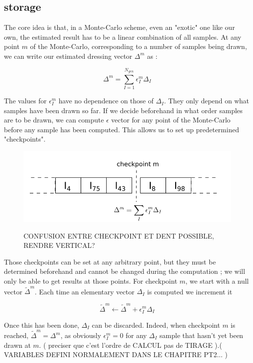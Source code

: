 \subsection{storage}

The core idea is that, in a Monte-Carlo scheme, even an "exotic" one like our own, the estimated result has to be a linear combination of all samples. At any point $m$ of the Monte-Carlo, corresponding to a number of samples being drawn, we can write our estimated dressing vector $\Delta^m$ as :

$$\Delta^m = \sum_{I=1}^{N_{gen}} \epsilon^m_{I} \Delta_I$$

The values for $\epsilon^m_I$ have no dependence on those of $\Delta_I$. They only depend on what samples have been drawn so far. If we decide beforehand in what order samples are to be drawn, we can compute $\epsilon$ vector for any point of the Monte-Carlo before any sample has been computed. This allows us to set up predetermined "checkpoints".

\begin{figure}[h!]
	\begin{center}
		\includegraphics[width=1.00\columnwidth]{figures/matrix_dressing/checkpoint}
		\caption{\label{checkpoint}}
		CONFUSION ENTRE CHECKPOINT ET DENT POSSIBLE, RENDRE VERTICAL?
	\end{center}
\end{figure}


Those checkpoints can be set at any arbitrary point, but they must be determined beforehand and cannot be changed during the computation ; we will only be able to get results at those points.
For checkpoint $m$, we start with a null vector $\tilde \Delta^m$. Each time an elementary vector $\Delta_I$ is computed
we increment it 


$$\tilde \Delta^m \gets \tilde \Delta^m + \epsilon_I^m \Delta_I$$

Once this has been done, $\Delta_I$ can be discarded. Indeed, when checkpoint $m$ is reached, $\tilde \Delta^m = \Delta^m$, as obviously $\epsilon_I^m = 0$ for any $\Delta_I$ sample that hasn't yet been drawn at $m$. ( preciser que c'est l'ordre de CALCUL pas de TIRAGE ).( VARIABLES DEFINI NORMALEMENT DANS LE CHAPITRE PT2... )

